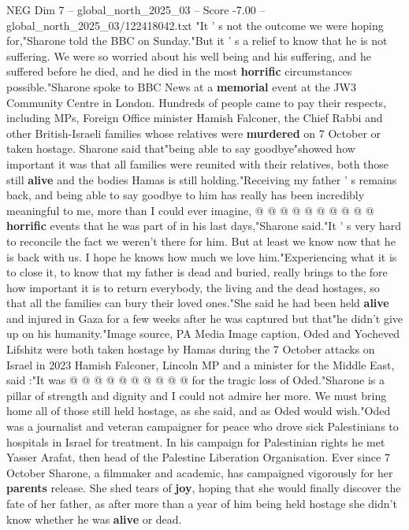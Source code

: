 \begin{textsample}{NEG Dim 7 – global\_north\_2025\_03 – Score -7.00 – global\_north\_2025\_03/122418042.txt}  \label{ex:f7_neg_128}
"It ' s not the outcome we were hoping for,"Sharone told the BBC on Sunday."But it ' s a relief to know that he is not suffering.
We were so worried about his well being and his suffering, and he suffered before he died, and he died in the most \textbf{horrific} circumstances possible."Sharone spoke to BBC News at a \textbf{memorial} event at the JW3 Community Centre in London.
Hundreds of people came to pay their respects, including MPs, Foreign Office minister Hamish Falconer, the Chief Rabbi and other British-Israeli families whose relatives were \textbf{murdered} on 7 October or taken hostage.
Sharone said that"being able to say goodbye"showed how important it was that all families were reunited with their relatives, both those still \textbf{alive} and the bodies Hamas is still holding."Receiving my father ' s remains back, and being able to say goodbye to him has really has been incredibly meaningful to me, more than I could ever imagine, @ @ @ @ @ @ @ @ @ @ \textbf{horrific} events that he was part of in his last days,"Sharone said."It ' s very hard to reconcile the fact we weren't there for him.
But at least we know now that he is back with us.
I hope he knows how much we love him."Experiencing what it is to close it, to know that my father is dead and buried, really brings to the fore how important it is to return everybody, the living and the dead hostages, so that all the families can bury their loved ones."She said he had been held \textbf{alive} and injured in Gaza for a few weeks after he was captured but that"he didn't give up on his humanity."Image source, PA Media Image caption, Oded and Yocheved Lifshitz were both taken hostage by Hamas during the 7 October attacks on Israel in 2023 Hamish Falconer, Lincoln MP and a minister for the Middle East, said :"It was @ @ @ @ @ @ @ @ @ @ for the tragic loss of Oded."Sharone is a pillar of strength and dignity and I could not admire her more.
We must bring home all of those still held hostage, as she said, and as Oded would wish."Oded was a journalist and veteran campaigner for peace who drove sick Palestinians to hospitals in Israel for treatment.
In his campaign for Palestinian rights he met Yasser Arafat, then head of the Palestine Liberation Organisation.
Ever since 7 October Sharone, a filmmaker and academic, has campaigned vigorously for her \textbf{parents} release.
She shed tears of \textbf{joy}, hoping that she would finally discover the fate of her father, as after more than a year of him being held hostage she didn't know whether he was \textbf{alive} or dead.

\end{textsample}
